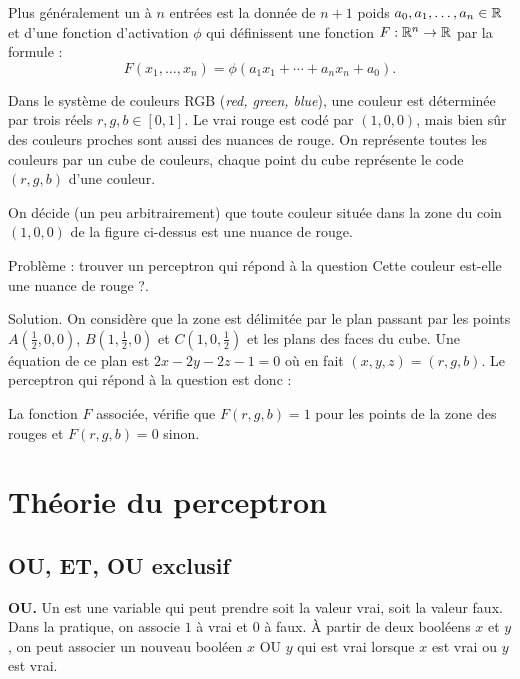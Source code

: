 Plus généralement un   à $n$ entrées est la donnée de $n+1$ poids $a_0,a_1,\ldots,a_n \in \mathbb{R}$
et d'une fonction d'activation $\phi$ qui définissent une fonction $F : \mathbb{R}^n \to \mathbb{R}$
par la formule :
$$F(x_1,\ldots,x_n) = \phi(a_1 x_1 + \cdots + a_n x_n + a_0).$$

\begin{exemple}{}{}
	Dans le système de couleurs RGB (\emph{red, green, blue}), une couleur est déterminée par trois réels $r,g,b \in [0,1]$.
	Le \og{}vrai\fg{} rouge est codé par $(1,0,0)$, mais bien sûr des couleurs proches sont aussi des nuances de rouge.
	On représente toutes les couleurs par un \og{}cube de couleurs\fg{}, chaque point du cube représente le code $(r,g,b)$ d'une couleur.
	
	
	On décide (un peu arbitrairement) que toute couleur située dans la zone du coin $(1,0,0)$ de la figure ci-dessus est une nuance de rouge.
	
	Problème : trouver un perceptron qui répond à la question \og{}Cette couleur est-elle une nuance de rouge ?\fg{}.
	
	Solution. On considère que la zone est délimitée par le plan passant par les points $A(\frac12,0,0)$, $B(1,\frac12,0)$ et $C(1,0,\frac12)$ et les plans des faces du cube.
	Une équation de ce plan est $2x-2y-2z-1 = 0$ où en fait $(x,y,z)=(r,g,b)$.
	Le perceptron qui répond à la question est donc :
	
	
	La fonction $F$ associée, vérifie que $F(r,g,b) = 1$ pour les points de la zone des rouges et $F(r,g,b)=0$ sinon.
	
\end{exemple}



\section{Théorie du perceptron}

\subsection{OU, ET, OU exclusif}

\textbf{OU.}
Un   est une variable qui peut prendre soit la valeur \og{}vrai\fg{}, soit la valeur \og{}faux\fg{}. 
Dans la pratique, on associe $1$ à \og{}vrai\fg{} et $0$ à \og{}faux\fg. \`A partir de deux booléens $x$ et $y$, on peut associer un nouveau booléen
\og{}$x$ OU $y$\fg{} qui est vrai lorsque $x$ est vrai ou $y$ est vrai.

